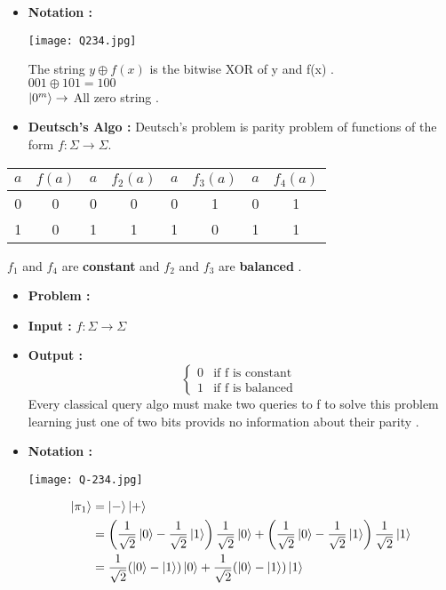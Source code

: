 \documentclass[12pt]{beamer}
\begin{document}
\begin{frame}
\begin{itemize}
\item\textbf{Notation :}
 \begin{center}
        \texttt{[image: Q234.jpg]}
    \end{center}
The string $y \oplus f(x)$ is the bitwise XOR of y and f(x) . \\
$001 \oplus 101 = 100 $\\
 $\ket{0^m} \rightarrow $ All zero string . 
\item\textbf{Deutsch's Algo :}
Deutsch's problem is parity problem of functions of the form  $f:\Sigma \rightarrow \Sigma$.
\end{itemize}
\end{frame}
\begin{frame}

 
  \begin{table}[ht]
    \centering
    \begin{tabular}{|c|c||c|c||c|c||c|c|}
      \hline
      $a$ & $f(a)$ & $a$ & $f_2(a)$ & $a$ & $f_3(a)$ & $a$ & $f_4(a)$ \\
      \hline
      0 & 0 & 0 & 0 & 0 & 1 & 0 & 1 \\
      1 & 0 & 1 & 1 & 1 & 0 & 1 & 1 \\
      \hline
    \end{tabular}
  \end{table}
$f_1$ and $f_4$ are \textbf{constant} and $f_2$ and $f_3$ are \textbf{balanced} .
\begin{itemize}
\item\textbf{Problem :}
\item\textbf{Input :}
$f:\Sigma \rightarrow \Sigma$
\item\textbf{Output :}
 \[
\begin{cases}
    0 & \text{if f is constant }  \\
    1 & \text{if f is balanced }
\end{cases}
\]
Every classical query algo must make two queries to f to solve this problem learning just one of two bits provids no information about their parity .
\end{itemize}
\end{frame}
\begin{frame}
\begin{itemize}
\item\textbf{Notation :}
 \begin{center}
        \texttt{[image: Q-234.jpg]}
    \end{center}
\begin{align*}
\ket{\pi_1} &= \ket{-} \ket{+} \\
&= \left(\frac{1}{\sqrt{2}}\ket{0} - \frac{1}{\sqrt{2}}\ket{1}\right) \frac{1}{\sqrt{2}}\ket{0} + \left(\frac{1}{\sqrt{2}}\ket{0} - \frac{1}{\sqrt{2}}\ket{1}\right) \frac{1}{\sqrt{2}}\ket{1} \\
&= \frac{1}{\sqrt{2}} (\ket{0} - \ket{1}) \ket{0} + \frac{1}{\sqrt{2}} (\ket{0} - \ket{1}) \ket{1}
\end{align*}
\end{itemize}
\end{frame}
\end{document}
